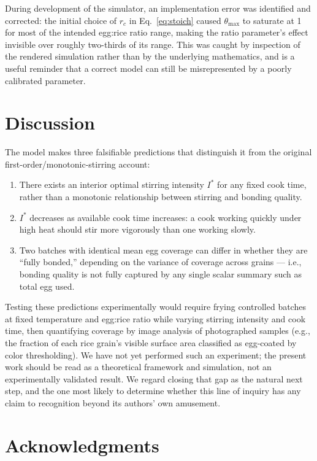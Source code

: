 \documentclass[11pt]{article}
\begin{document}
During development of the simulator, an implementation error was identified and corrected: the initial choice of $r_c$ in Eq.~\eqref{eq:stoich} caused $\theta_{\max}$ to saturate at 1 for most of the intended egg:rice ratio range, making the ratio parameter's effect invisible over roughly two-thirds of its range. This was caught by inspection of the rendered simulation rather than by the underlying mathematics, and is a useful reminder that a correct model can still be misrepresented by a poorly calibrated parameter.

\section{Discussion}

The model makes three falsifiable predictions that distinguish it from the original first-order/monotonic-stirring account:
\begin{enumerate}
    \item There exists an interior optimal stirring intensity $I^*$ for any fixed cook time, rather than a monotonic relationship between stirring and bonding quality.
    \item $I^*$ decreases as available cook time increases: a cook working quickly under high heat should stir more vigorously than one working slowly.
    \item Two batches with identical mean egg coverage can differ in whether they are ``fully bonded,'' depending on the variance of coverage across grains — i.e., bonding quality is not fully captured by any single scalar summary such as total egg used.
\end{enumerate}
Testing these predictions experimentally would require frying controlled batches at fixed temperature and egg:rice ratio while varying stirring intensity and cook time, then quantifying coverage by image analysis of photographed samples (e.g., the fraction of each rice grain's visible surface area classified as egg-coated by color thresholding). We have not yet performed such an experiment; the present work should be read as a theoretical framework and simulation, not an experimentally validated result. We regard closing that gap as the natural next step, and the one most likely to determine whether this line of inquiry has any claim to recognition beyond its authors' own amusement.

\section*{Acknowledgments}
\end{document}
